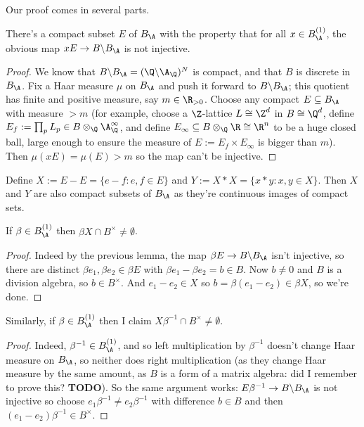 Our proof comes in several parts.


\begin{lemma}
  \label{E}
  There's a compact subset $E$ of $B_{\A}$
  with the property that for all $x\in B_{\A}^{(1)}$,
  the obvious map $xE\to B\backslash B_{\A}$ is not injective.
\end{lemma}

\begin{proof} We know that $B\backslash B_{\A}=(\Q\backslash\A_{\Q})^N$
  is compact, and that $B$ is discrete in $B_{\A}$.
    Fix a Haar measure $\mu$ on $B_{\A}$ and push it forward
    to $B\backslash B_{\A}$; this quotient has finite
    and positive measure, say $m\in\R_{>0}$.
    Choose any compact $E\subseteq B_{\A}$ with measure $> m$
    (for example, choose a $\Z$-lattice $L\cong\Z^d$ in $B\cong\Q^d$,
    define $E_f:=\prod_p L_p\in B\otimes_{\Q}\A_{\Q}^\infty$,
    and define $E_{\infty}\subseteq B\otimes_{\Q}\R\cong\R^n$ to be a huge closed
    ball, large enough to ensure the measure of $E:=E_f\times E_{\infty}$ is bigger than $m$).
    Then $\mu(xE)=\mu(E)>m$ so the map can't be injective.
\end{proof}

Define $X:=E-E=\{e-f:e,f\in E\}$ and $Y:=X*X=\{x*y:x,y\in X\}$.
  Then $X$ and $Y$ are
  also compact subsets of $B_{\A}$ as they're continuous images
  of compact sets.

  \begin{lemma}
    \label{X_meets_kernel}
    If $\beta\in B_{\A}^{(1)}$ then
  $\beta X\cap B^\times\not=\emptyset$.
  \end{lemma}
  \begin{proof}
  Indeed by the previous lemma, the map $\beta E\to B\backslash B_{\A}$
  isn't injective, so there are distinct
  $\beta e_1,\beta e_2\in \beta E$ with
  $\beta e_1-\beta e_2=b\in B$.
  Now $b\not=0$ and $B$ is a division algebra, so $b\in B^\times$.
  And $e_1-e_2\in X$ so $b=\beta(e_1-e_2)\in \beta X$, so we're done.
\end{proof}

\begin{lemma}
  \label{X_meets_kernel'}
  Similarly, if $\beta\in B_{\A}^{(1)}$ then I claim
  $X\beta^{-1}\cap B^\times\not=\emptyset$.
\end{lemma}
\begin{proof}
  Indeed, $\beta^{-1}\in B_{\A}^{(1)}$, and so left multiplication by $\beta^{-1}$
  doesn't change Haar measure on $B_{\A}$, so neither does right multiplication
  (as they change Haar measure by the same amount, as $B$ is a form of a matrix
  algebra: did I remember to prove this? {\bf TODO}).
  So the same argument works: $E\beta^{-1}\to B\backslash B_{\A}$ is not
  injective so choose $e_1\beta^{-1}\not=e_2\beta^{-1}$ with difference $b\in B$
  and then $(e_1-e_2)\beta^{-1}\in B^\times$.
\end{proof}

